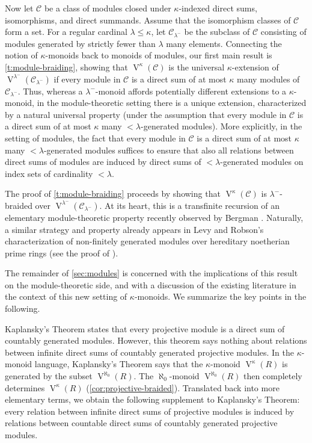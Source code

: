 \documentclass[a4paper,11pt,oneside]{amsart}
\theoremstyle{remark}
\newcommand{\cC}{\mathcal C}
\DeclareMathOperator{\Vmon}{V}
\begin{document}
Now let $\cC$ be a class of modules closed under $\kappa$-indexed direct sums, isomorphisms, and direct summands.
Assume that the isomorphism classes of $\cC$ form a set.
For a regular cardinal $\lambda \le \kappa$, let $\cC_{\lambda^-}$ be the subclass of $\cC$ consisting of modules generated by strictly fewer than $\lambda$ many elements.
Connecting the notion of $\kappa$-monoids back to monoids of modules, our first main result is \cref{t:module-braiding}, showing that $\Vmon^{\kappa}(\cC)$ is the universal $\kappa$-extension of $\Vmon^{\lambda^-}(\cC_{\lambda^-})$ if every module in $\cC$ is a direct sum of at most $\kappa$ many modules of $\cC_{\lambda^-}$.
Thus, whereas a $\lambda^-$-monoid affords potentially different extensions to a $\kappa$-monoid, in the module-theoretic setting there is a unique extension, characterized by a natural universal property (under the assumption that every module in $\cC$ is a direct sum of at most $\kappa$ many $<\!\lambda$-generated modules).
More explicitly, in the setting of modules, the fact that every module in $\cC$ is a direct sum of at most $\kappa$ many $<\!\lambda$-generated modules suffices to ensure that also all relations between direct sums of modules are induced by direct sums of $<\!\lambda$-generated modules on index sets of cardinality $<\!\lambda$.

The proof of \cref{t:module-braiding} proceeds by showing that $\Vmon^{\kappa}(\cC)$ is $\lambda^-$-braided over $\Vmon^{\lambda^-}(\cC_{\lambda^-})$.
At its heart, this is a transfinite recursion of an elementary module-theoretic property recently observed by Bergman \cite{Bergman23}.
Naturally, a similar strategy and property already appears in Levy and Robson's characterization of non-finitely generated modules over hereditary noetherian prime rings (see the proof of \cite[Theorem 46.1]{LevyRobson11}).

The remainder of \cref{sec:modules} is concerned with the implications of this result on the module-theoretic side, and with a discussion of the existing literature in the context of this new setting of $\kappa$-monoids.
We summarize the key points in the following.

Kaplansky's Theorem states that every projective module is a direct sum of countably generated modules.
However, this theorem says nothing about relations between infinite direct sums of countably generated projective modules.
In the $\kappa$-monoid language, Kaplansky's Theorem says that the $\kappa$-monoid $\Vmon^{\kappa}(R)$ is generated by the subset $\Vmon^{\aleph_0}(R)$.
The $\aleph_0$-monoid $\Vmon^{\aleph_0}(R)$ then completely determines $\Vmon^{\kappa}(R)$ (\cref{cor:projective-braided}).
Translated back into more elementary terms, we obtain the following supplement to Kaplansky's Theorem: every relation between infinite direct sums of projective modules is induced by relations between countable direct sums of countably generated projective modules.
\end{document}
